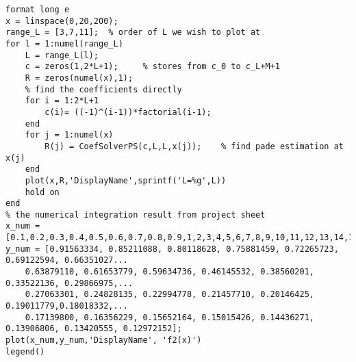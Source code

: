 \lstset{basicstyle=\footnotesize,style=myCustomMatlabStyle}
\begin{lstlisting}
format long e
x = linspace(0,20,200);
range_L = [3,7,11];  % order of L we wish to plot at
for l = 1:numel(range_L)
    L = range_L(l);
    c = zeros(1,2*L+1);     % stores from c_0 to c_L+M+1
    R = zeros(numel(x),1);
    % find the coefficients directly
    for i = 1:2*L+1
        c(i)= ((-1)^(i-1))*factorial(i-1);
    end
    for j = 1:numel(x)
        R(j) = CoefSolverPS(c,L,L,x(j));    % find pade estimation at x(j)
    end
    plot(x,R,'DisplayName',sprintf('L=%g',L))
    hold on
end
% the numerical integration result from project sheet
x_num = [0.1,0.2,0.3,0.4,0.5,0.6,0.7,0.8,0.9,1,2,3,4,5,6,7,8,9,10,11,12,13,14,15,16,17,18,19,20];
y_num = [0.91563334, 0.85211088, 0.80118628, 0.75881459, 0.72265723, 0.69122594, 0.66351027...
    0.63879110, 0.61653779, 0.59634736, 0.46145532, 0.38560201, 0.33522136, 0.29866975,...
    0.27063301, 0.24828135, 0.22994778, 0.21457710, 0.20146425, 0.19011779,0.18018332,...
    0.17139800, 0.16356229, 0.15652164, 0.15015426, 0.14436271, 0.13906806, 0.13420555, 0.12972152];
plot(x_num,y_num,'DisplayName', 'f2(x)')
legend()

\end{lstlisting}